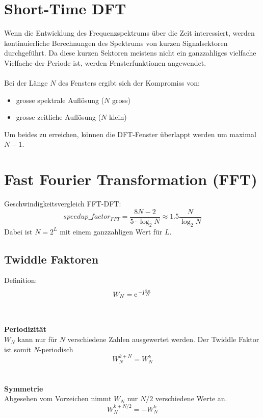 \section{Short-Time DFT}
Wenn die Entwicklung des Frequenzspektrums über die Zeit interessiert, werden
kontinuierliche Berechnungen des Spektrums von kurzen Signalsektoren 
durchgeführt. Da diese kurzen Sektoren meistens nicht ein ganzzahliges
vielfache Vielfache der Periode ist, werden Fensterfunktionen angewendet.\\
\\
Bei der Länge $N$ des Fensters ergibt sich der Kompromiss von:
\begin{itemize}
	\item grosse spektrale Auflösung ($N$ gross)
	\item grosse zeitliche Auflösung ($N$ klein)
\end{itemize}

Um beides zu erreichen, können die DFT-Fenster überlappt werden um maximal
$N-1$.

\section{Fast Fourier Transformation (FFT)}
Geschwindigkeitsvergleich FFT-DFT:
\[ speedup\_factor_{FFT} = \frac{8N-2}{5\cdot \log_2N} \approx 1.5 	
	\frac{N}{\log_2N} \]
Dabei ist $N = 2^L$ mit einem ganzzahligen Wert für $L$.

\subsection{Twiddle Faktoren}
Definition:
\[ W_N = \e^{-\im\frac{2\pi}{N}} \]\\
\\
\textbf{Periodizität}\\
$W_N$ kann nur für $N$ verschiedene Zahlen ausgewertet werden. Der Twiddle
Faktor ist somit $N$-periodisch
\[ W_N^{k+N} = W_N^k \]\\
\\
\textbf{Symmetrie}\\
Abgesehen vom Vorzeichen nimmt $W_N$ nur $N/2$ verschiedene Werte an.
\[ W_N^{k+N/2} = -W_N^k \]

